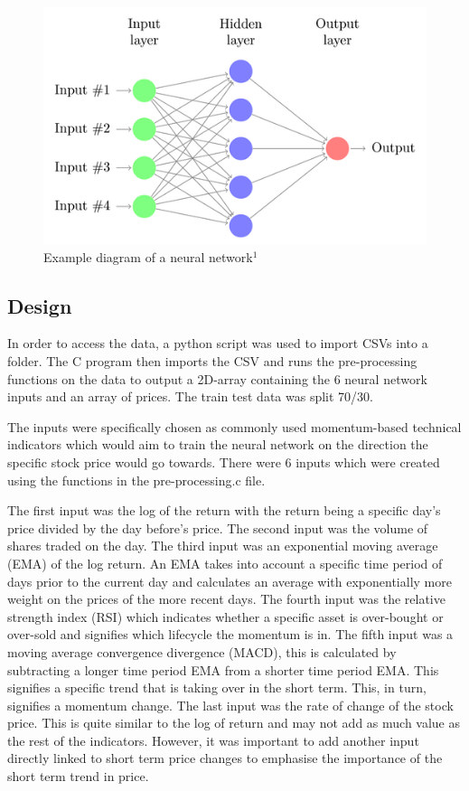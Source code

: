 \documentclass[11pt]{article}
\begin{document}
\begin{figure}[h]
\includegraphics[scale=0.8]{neural-network}
\caption{Example diagram of a neural network$^1$}
\end{figure}

\subsection{Design}
In order to access the data, a python script was used to import CSVs into a folder. The C program then imports the CSV and runs the pre-processing functions on the data to output a 2D-array containing the 6 neural network inputs and an array of prices. The train test data was split 70/30.

The inputs were specifically chosen as commonly used momentum-based technical indicators which would aim to train the neural network on the direction the specific stock price would go towards. There were 6 inputs which were created using the functions in the pre-processing.c file. 

The first input was the log of the return with the return being a specific day's price divided by the day before's price. The second input was the volume of shares traded on the day. The third input was an exponential moving average (EMA) of the log return. An EMA takes into account a specific time period of days prior to the current day and calculates an average with exponentially more weight on the prices of the more recent days. The fourth input was the relative strength index (RSI) which indicates whether a specific asset is over-bought or over-sold and signifies which lifecycle the momentum is in. The fifth input was a moving average convergence divergence (MACD), this is calculated by subtracting a longer time period EMA from a shorter time period EMA. This signifies a specific trend that is taking over in the short term. This, in turn, signifies a momentum change. The last input was the rate of change of the stock price. This is quite similar to the log of return and may not add as much value as the rest of the indicators. However, it was important to add another input directly linked to short term price changes to emphasise the importance of the short term trend in price.
\end{document}
